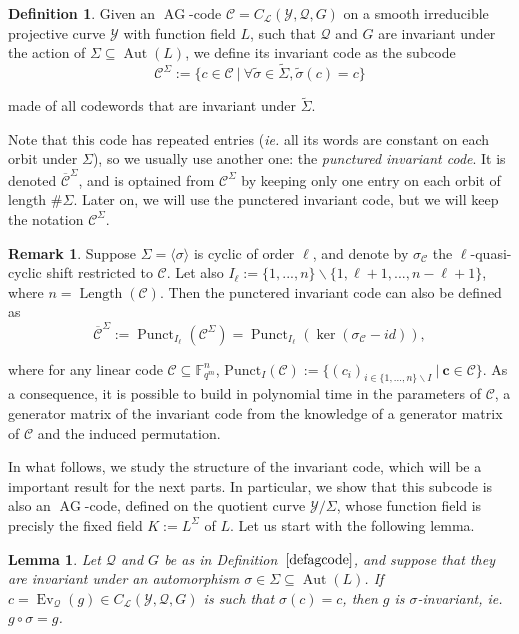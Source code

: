 \documentclass[10pt]{article}
\newtheorem{lem1}[thm]{Lemma}
\theoremstyle{definition}
\newtheorem{rq1}[thm]{Remark}
\theoremstyle{definition}
\theoremstyle{definition}
\newtheorem{def1}[thm]{Definition}
\newcommand{\C}{\mathcal{C}}
\newcommand{\Fqm}{\mathbb{F}_{q^m}}
\newcommand{\su}{\subseteq}
\newcommand{\Y}{\mathcal{Y}}
\newcommand{\QR}{\mathcal{Q}}
\newcommand{\Aut}{\operatorname{Aut}}
\newcommand{\ag}{\operatorname{AG}}
\newcommand{\calL}{\mathcal{L}}
\begin{document}
\begin{def1} Given an $\ag$-code $\mathcal{C} = C_{\calL}(\Y,\QR,G)$ on a smooth irreducible projective curve $\Y$ with function field $L$, such that $\QR$ and $G$ are invariant under the action of $\Sigma \su \Aut(L)$, we define its invariant code as the subcode 
\[\mathcal{C}^{\Sigma} := \{c \in \mathcal{C} \ | \ \forall\tilde{\sigma}\in\tilde{\Sigma},\tilde{\sigma}(c)=c\}\]
\end{def1}
made of all codewords that are invariant under $\tilde{\Sigma}$.

Note that this code has repeated entries (\textit{ie.} all its words are constant on each orbit under $\Sigma$), so we usually use another one: the \emph{punctured invariant code}. It is denoted $\overline{\mathcal{C}}^{\Sigma}$, and is optained from $\C^{\Sigma}$ by keeping only one entry on each orbit of length $\#\Sigma$. Later on, we will use the punctered invariant code, but we will keep the notation $\mathcal{C}^{\Sigma}$. 

\begin{rq1}  \label{gen inv}
Suppose $\Sigma = \langle \sigma \rangle$ is cyclic of order $\ell$, and denote by $\sigma_{\mathcal{C}}$ the $\ell$-quasi-cyclic shift restricted to $\mathcal{C}$. Let also $I_{\ell} := \{1,...,n\}\backslash \{1,\ell+1,...,n-\ell+1\}$, where $n=\operatorname{Length}(\mathcal{C})$. Then the punctered invariant code can also be defined as
\[ \overline{\mathcal{C}}^{\Sigma} := \operatorname{Punct}_{I_{\ell}}(\mathcal{C}^{\Sigma}) = \operatorname{Punct}_{ I_{\ell}}(\ker (\sigma_{\mathcal{C}}-id)),\]

 where for any linear code $\mathcal{C} \su \Fqm^n$, $\mathrm{Punct}_I(\mathcal{C}):= \{(c_i)_{i \in \{1,...,n\}\backslash I} \ | \ \mathbf{c} \in \mathcal{C}\}$. 
As a consequence, it is possible to build in polynomial time in the parameters of $\mathcal{C}$, a generator matrix of the invariant code from the knowledge of a generator matrix of $\mathcal{C}$ and the induced permutation. 
\end{rq1}

In what follows, we study the structure of the invariant code, which will be a important result for the next parts. In particular, we show that this subcode is also an $\ag$-code, defined on the quotient curve $\Y/\Sigma$, whose function field is precisly the fixed field $K:=L^{\Sigma}$ of $L$. Let us start with the following lemma.

\begin{lem1} \label{inv}
Let $\QR$ and $G$ be as in Definition~$\ref{defagcode}$, and suppose that they are invariant under an automorphism $\sigma \in \Sigma \su \Aut(L)$. If $c = \operatorname{Ev}_{\QR}(g) \in C_{\calL}(\Y,\QR,G)$ is such that $\sigma(c) = c$, then $g$ is $\sigma$-invariant, ie. $g\circ \sigma = g$. 
\end{lem1}
\end{document}
